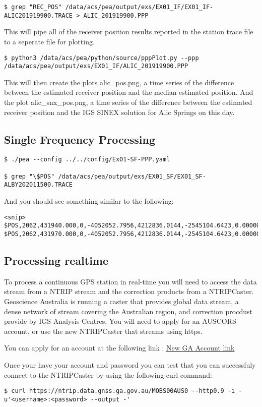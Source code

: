 \begin{verbatim}
$ grep "REC_POS" /data/acs/pea/output/exs/EX01_IF/EX01_IF-ALIC201919900.TRACE > ALIC_201919900.PPP
\end{verbatim}
This will pipe all of the receiver position results reported in the station trace file to a seperate file for plotting.
\begin{verbatim}
$ python3 /data/acs/pea/python/source/pppPlot.py --ppp /data/acs/pea/output/exs/EX01_IF/ALIC_201919900.PPP
\end{verbatim}
This will then create the plots alic\_pos.png, a time series of the difference between the estimated receiver position and the median estimated position.
And the plot alic\_snx\_pos.png, a time series of the difference between the estimated receiver position and the IGS SINEX solution for Alic Springs on this day.

\subsection{Single Frequency Processing} 
\begin{verbatim}
$ ./pea --config ../../config/Ex01-SF-PPP.yaml

$ grep "\$POS" /data/acs/pea/output/exs/EX01_SF/EX01_SF-ALBY202011500.TRACE
\end{verbatim}
And you should see something similar to the following:
\begin{verbatim}
<snip>
$POS,2062,431940.000,0,-4052052.7956,4212836.0144,-2545104.6423,0.00000043966020,0.00000039738502,0.00000013421476
$POS,2062,431970.000,0,-4052052.7956,4212836.0144,-2545104.6423,0.00000043965772,0.00000039738393,0.00000013421667
\end{verbatim}



\subsection{Processing realtime}
To process a continuous GPS station in real-time you will need to access the data stream from a NTRIP stream and the correction products from a NTRIPCaster.
Geoscience Australia is running a caster that provides global data stream, a dense network of stream covering the Australian region, and correction procdust provide by IGS Analysis Centres.
You will need to apply for an AUSCORS account, or use the new NTRIPCaster that streams using https.

You can apply for an account at the following link : \href{https://gnss-users-prod.auth.ap-southeast-2.amazoncognito.com/login?response_type=code&client_id=11njl767q0tl1faf9qna469vl1&redirect_uri=https://search-gnss-elasticsearch-prod-5omhch5quzlu5dcpbct4ev5qz4.ap-southeast-2.es.amazonaws.com/_plugin/kibana/app/kibana&state=e36b2054-7ace-4931-91a3-5ba6de893917}{New GA Account link}

Once your have your account and password you can test that you can successfuly connect to the NTRIPCaster by using the following curl command:
\begin{Verbatim}
$ curl https://ntrip.data.gnss.ga.gov.au/MOBS00AUS0 --http0.9 -i -u'<username>:<password> --output -'
\end{Verbatim}

